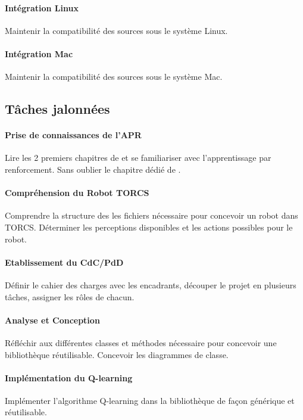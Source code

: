\documentclass[a4paper,12pt]{article}
\begin{document}
      \paragraph{Intégration Linux} Maintenir la compatibilité des sources sous le système Linux.
      
      \paragraph{Intégration Mac} Maintenir la compatibilité des sources sous le système Mac.

    \subsection{Tâches jalonnées}
    
      \paragraph{Prise de connaissances de l'APR} Lire les 2 premiers chapitres de \cite{PDMIA} et se familiariser avec 
      l'apprentissage par renforcement. Sans oublier le chapitre dédié de \cite{IntArt}.
      
      \paragraph{Compréhension du Robot TORCS} Comprendre la structure des les fichiers nécessaire pour concevoir un robot 
      dans TORCS. Déterminer les perceptions disponibles et les actions possibles pour le robot.
    
      \paragraph{Etablissement du CdC/PdD} Définir le cahier des charges avec les encadrants, découper le projet en plusieurs
      tâches, assigner les rôles de chacun.
    
      \paragraph{Analyse et Conception} Réfléchir aux différentes classes et méthodes nécessaire pour concevoir une
      bibliothèque réutilisable. Concevoir les diagrammes de classe.
      
      \paragraph{Implémentation du Q-learning} Implémenter l'algorithme Q-learning dans la bibliothèque de façon générique
      et réutilisable.
      
\end{document}
